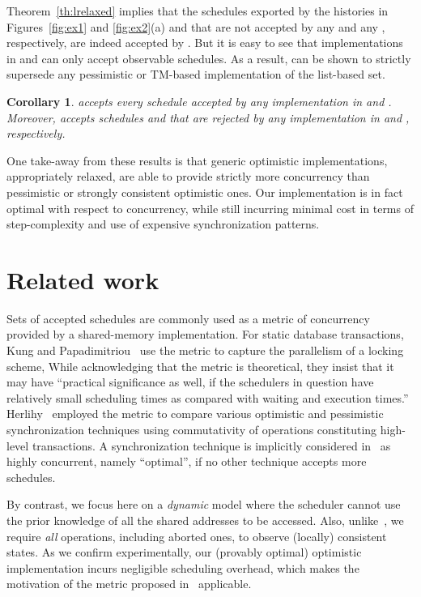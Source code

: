 \documentclass[11pt,pdftex,letterpaper]{article}
\newtheorem{corollary}[theorem]{Corollary}
\begin{document}
Theorem~\ref{th:lrelaxed} implies that the schedules exported by the
histories in Figures~\ref{fig:ex1} and \ref{fig:ex2}(a) and that are not
accepted by any  and any , respectively,
are indeed accepted by .
But it is easy to see that implementations in  and  can only
accept observable schedules.  
As a result,  can be shown to strictly supersede any
pessimistic or TM-based implementation of the list-based set.  
\begin{corollary}
\label{cr:mrp}
 accepts every schedule accepted by any implementation in  and .
Moreover,  accepts schedules  and  that are rejected by any
implementation in  and , respectively. 
\end{corollary}
One take-away from these results is that generic optimistic implementations,
appropriately relaxed, are able to provide strictly more concurrency
than pessimistic or strongly consistent optimistic ones.
Our implementation  is in fact optimal with respect to
concurrency, while still incurring minimal cost in terms of step-complexity and
use of expensive synchronization patterns. 
\section{Related work}
\label{sec:related}
Sets of accepted schedules are commonly used as a
metric of concurrency provided by a shared-memory
implementation.
For static database transactions, 
Kung and Papadimitriou~\cite{KP79} use the metric to 
capture the parallelism of a locking scheme,
While acknowledging that the metric is theoretical, they 
insist that it may
have ``practical significance as
well, if the schedulers in question have relatively small
scheduling times as compared with waiting and execution
times.'' 
Herlihy~\cite{Her90} employed the metric to compare various
optimistic and pessimistic synchronization techniques using
commutativity
of operations constituting high-level transactions.   
A synchronization technique is implicitly considered in~\cite{Her90} as highly
concurrent, namely ``optimal'',
if no other technique accepts more schedules. 


By contrast, we focus here on a \emph{dynamic} model where the scheduler cannot 
use the prior knowledge of all the shared addresses to be accessed. 
Also, unlike~\cite{KP79,Her90}, we require \emph{all} operations, including aborted ones, to observe (locally) consistent states.
As we confirm experimentally, 
our (provably optimal) optimistic implementation incurs negligible scheduling overhead, which makes the motivation of the metric proposed
in~\cite{KP79} applicable. 
\end{document}

